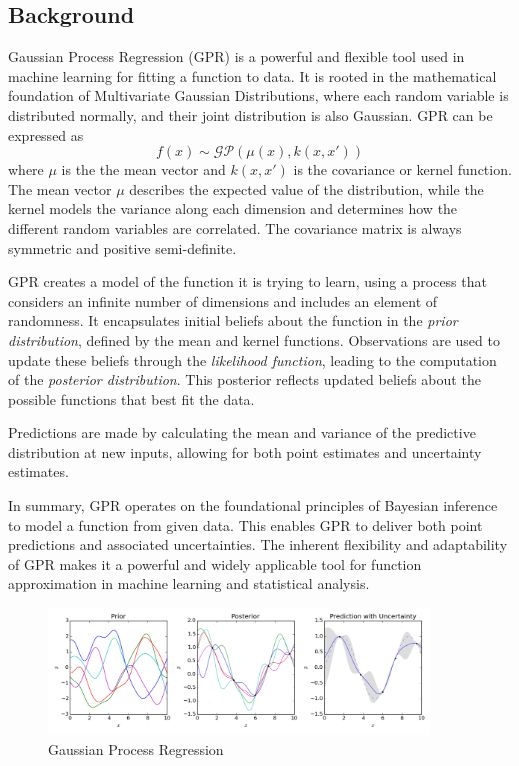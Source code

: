 \subsection{Background}

Gaussian Process Regression (GPR) is a powerful and flexible tool used in machine learning for fitting a function to data. It is rooted in the mathematical foundation of Multivariate Gaussian Distributions, where each random variable is distributed normally, and their joint distribution is also Gaussian. GPR can be expressed as 
\begin{equation}
    f(x) \sim \mathcal{GP}(\mu(x), k(x, x'))
\end{equation}
where  \( \mu \) is the the mean vector and \( k(x, x') \) is the covariance or kernel function. The mean vector \( \mu \) describes the expected value of the distribution, while the kernel models the variance along each dimension and determines how the different random variables are correlated. The covariance matrix is always symmetric and positive semi-definite.

GPR creates a model of the function it is trying to learn, using a process that considers an infinite number of dimensions and includes an element of randomness. It encapsulates initial beliefs about the function in the \textit{prior distribution}, defined by the mean and kernel functions. Observations are used to update these beliefs through the \textit{likelihood function}, leading to the computation of the \textit{posterior distribution}. This posterior reflects updated beliefs about the possible functions that best fit the data.

Predictions are made by calculating the mean and variance of the predictive distribution at new inputs, allowing for both point estimates and uncertainty estimates. 

In summary, GPR operates on the foundational principles of Bayesian inference to model a function from given data. This enables GPR to deliver both point predictions and associated uncertainties. The inherent flexibility and adaptability of GPR makes it a powerful and widely applicable tool for function approximation in machine learning and statistical analysis. \cite{GPR}

\begin{figure}[h!]
    \centering
    \includegraphics[width=0.9\textwidth]{Pictures/Model/Gaussian_Process_Regression.png}
    \caption{Gaussian Process Regression \cite{GPR_Image}}
    \label{fig:GPR}
\end{figure}


